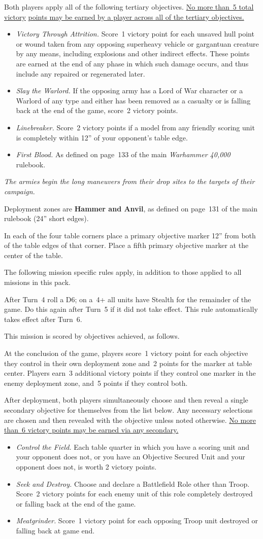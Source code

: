 \documentclass{40k}
\newcommand{\tertiaries}
{%
\missionsubheading{Tertiary Objectives.}  Both players apply all of
the following tertiary objectives.  \underline{No more than~5 total
  victory} \underline{points may be earned by a player across all of
  the tertiary objectives.}

\begin{itemize}
\item \textit{Victory Through Attrition.}  Score~1 victory point for
  each unsaved hull point or wound taken from any opposing superheavy
  vehicle or gargantuan creature by any means, including explosions
  and other indirect effects.  These points are earned at the end of
  any phase in which such damage occurs, and thus include any repaired
  or regenerated later.

\item \textit{Slay the Warlord.}  If the opposing army has a Lord of
  War character or a Warlord of any type and either has been removed
  as a casualty or is falling back at the end of the game, score~2
  victory points.

\item \textit{Linebreaker.}  Score~2 victory points if a model from
  any friendly scoring unit is completely within 12'' of your
  opponent's table edge.

\item \textit{First Blood.}  As defined on page~133 of the main
  \emph{Warhammer 40,000} rulebook.
\end{itemize}
}
\begin{document}
\tertiaries


\clearpage
{}

\centerline{\emph{The armies begin the long maneuvers from their drop
    sites to the targets of their campaign.}}


Deployment zones are \textbf{Hammer and Anvil}, as defined on page~131
of the main rulebook (24'' short edges).

\bigskip%
In each of the four table corners place a primary objective marker
12'' from both of the table edges of that corner.  Place a fifth
primary objective marker at the center of the table.


The following mission specific rules apply, in addition to those
applied to all missions in this pack.

  After Turn~4 roll a D6; on a~4+
all units have Stealth for the remainder of the game.  Do this again
after Turn~5 if it did not take effect.  This rule automatically takes
effect after Turn~6.



This mission is scored by objectives achieved, as follows.

 At the conclusion of the game,
players score~1 victory point for each objective they control in their
own deployment zone and~2 points for the marker at table center.
Players earn~3 additional victory points if they control one marker in
the enemy deployment zone, and~5 points if they control both.


After deployment, both players simultaneously choose and then reveal a
single secondary objective for themselves from the list below.  Any
necessary selections are chosen and then revealed with the objective
unless noted otherwise.  \underline{No more than~6 victory points may
  be earned via any secondary.}

\begin{itemize}
\item \textit{Control the Field.}  Each table quarter in which you
  have a scoring unit and your opponent does not, or you have an
  Objective Secured Unit and your opponent does not, is worth 2
  victory points.

\item \textit{Seek and Destroy.}  Choose and declare a Battlefield
  Role other than Troop.  Score~2 victory points for each enemy unit
  of this role completely destroyed or falling back at the end of the
  game.

\item \textit{Meatgrinder.}  Score~1 victory point for each opposing
  Troop unit destroyed or falling back at game end.

\end{itemize}
\end{document}
